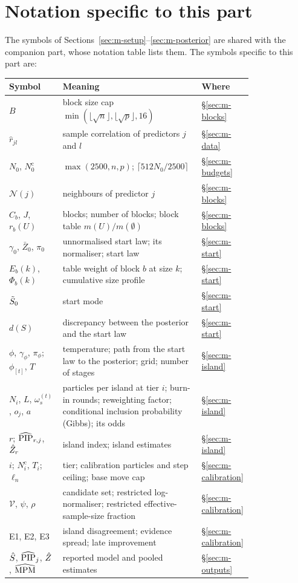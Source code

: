 \documentclass[11pt]{article}
\newcommand{\Nc}{N^{\mathrm c}}   %
\newcommand{\grid}[1]{\phi_{[#1]}}  %
\begin{document}
\section{Notation specific to this part}\label{app:m-notation}

The symbols of Sections~\ref{sec:m-setup}--\ref{sec:m-posterior} are shared with the companion part, whose notation
table lists them. The symbols specific to this part are:

{\small
\begin{longtable}{@{}p{0.22\linewidth}p{0.58\linewidth}l@{}}
\toprule
Symbol & Meaning & Where \\ \midrule \endhead
$B$ & block size cap $\min(\lfloor\sqrt n\rfloor,\lfloor\sqrt p\rfloor,16)$ & \S\ref{sec:m-blocks} \\
$\hat r_{jl}$ & sample correlation of predictors $j$ and $l$ & \S\ref{sec:m-data} \\
$N_0$, $\Nc_0$ & $\max(2500,n,p)$; $\lceil512N_0/2500\rceil$ & \S\ref{sec:m-budgets} \\
$\mathcal N(j)$ & neighbours of predictor $j$ & \S\ref{sec:m-blocks} \\
$C_b$, $J$, $r_b(U)$ & blocks; number of blocks; block table $m(U)/m(\emptyset)$ & \S\ref{sec:m-blocks} \\
$\gamma_0$, $\bar Z_0$, $\pi_0$ & unnormalised start law; its normaliser; start law & \S\ref{sec:m-start} \\
$E_b(k)$, $\Phi_b(k)$ & table weight of block $b$ at size $k$; cumulative size profile & \S\ref{sec:m-start} \\
$\tilde S_0$ & start mode & \S\ref{sec:m-start} \\
$d(S)$ & discrepancy between the posterior and the start law & \S\ref{sec:m-start} \\
$\phi$, $\gamma_\phi$, $\pi_\phi$; $\grid t$, $T$ & temperature; path from the start law to the posterior; grid; number of stages & \S\ref{sec:m-island} \\
$N_i$, $L$, $\omega^{(t)}_s$, $o_j$, $a$ & particles per island at tier $i$; burn-in rounds; reweighting factor; conditional inclusion probability (Gibbs); its odds & \S\ref{sec:m-island} \\
$r$; $\widehat{\mathrm{PIP}}_{r,j}$, $\hat Z_r$ & island index; island estimates & \S\ref{sec:m-island} \\
$i$; $\Nc_i$, $T_i$; $\ell_n$ & tier; calibration particles and step ceiling; base move cap & \S\ref{sec:m-calibration} \\
$\mathcal V$, $\psi$, $\rho$ & candidate set; restricted log-normaliser; restricted effective-sample-size fraction & \S\ref{sec:m-calibration} \\
E1, E2, E3 & island disagreement; evidence spread; late improvement & \S\ref{sec:m-calibration} \\
$\hat S$, $\widehat{\mathrm{PIP}}_j$, $\hat Z$, $\widehat{\mathrm{MPM}}$ & reported model and pooled estimates & \S\ref{sec:m-outputs} \\
\bottomrule
\end{longtable}}
\end{document}
